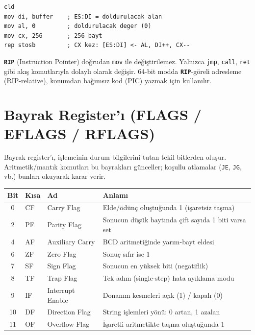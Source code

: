 \documentclass[11pt,a4paper]{article}
\newcommand{\reg}[1]{\texttt{\color{anaMavi}\textbf{#1}}}
\newcommand{\kod}[1]{\texttt{\color{koyuGri}#1}}
\begin{document}
\begin{ornekkutu}
\begin{lstlisting}
cld
mov di, buffer    ; ES:DI = doldurulacak alan
mov al, 0         ; doldurulacak deger (0)
mov cx, 256       ; 256 bayt
rep stosb         ; CX kez: [ES:DI] <- AL, DI++, CX--
\end{lstlisting}
\end{ornekkutu}

\begin{uyarikutu}
\reg{RIP} (Instruction Pointer) doğrudan \kod{mov} ile değiştirilemez.
Yalnızca \kod{jmp}, \kod{call}, \kod{ret} gibi akış komutlarıyla dolaylı olarak
değişir. 64-bit modda \reg{RIP}-göreli adresleme (RIP-relative), konumdan
bağımsız kod (PIC) yazmak için kullanılır.
\end{uyarikutu}

\section{Bayrak Register'ı (FLAGS / EFLAGS / RFLAGS)}

Bayrak register'ı, işlemcinin durum bilgilerini tutan tekil bitlerden oluşur.
Aritmetik/mantık komutları bu bayrakları günceller; koşullu atlamalar
(\kod{JE}, \kod{JG}, vb.) bunları okuyarak karar verir.

\begin{center}
\small
\begin{tabularx}{\textwidth}{@{}c l l >{\raggedright\arraybackslash}X@{}}
\toprule
\rowcolor{anaMavi}
\color{white}\textbf{Bit} & \color{white}\textbf{Kısa} & \color{white}\textbf{Ad} & \color{white}\textbf{Anlamı} \\
\midrule
0 & CF & Carry Flag & Elde/ödünç oluştuğunda 1 (işaretsiz taşma) \\
\rowcolor{acikGri} 2 & PF & Parity Flag & Sonucun düşük baytında çift sayıda 1 biti varsa set \\
4 & AF & Auxiliary Carry & BCD aritmetiğinde yarım-bayt eldesi \\
\rowcolor{acikGri} 6 & ZF & Zero Flag & Sonuç sıfır ise 1 \\
7 & SF & Sign Flag & Sonucun en yüksek biti (negatiflik) \\
\rowcolor{acikGri} 8 & TF & Trap Flag & Tek adım (single-step) hata ayıklama modu \\
9 & IF & Interrupt Enable & Donanım kesmeleri açık (1) / kapalı (0) \\
\rowcolor{acikGri} 10 & DF & Direction Flag & String işlemleri yönü: 0 artan, 1 azalan \\
11 & OF & Overflow Flag & İşaretli aritmetikte taşma oluştuğunda 1 \\
\bottomrule
\end{tabularx}
\end{center}
\end{document}
